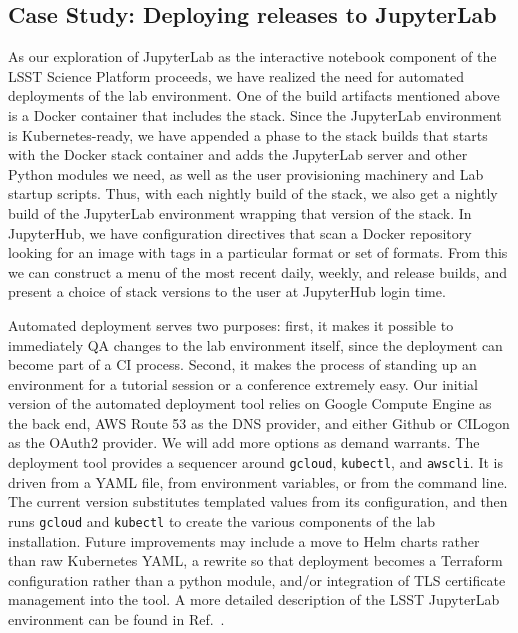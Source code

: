 \subsection{Case Study: Deploying releases to JupyterLab}
\label{sec:jupyterlab}

As our exploration of JupyterLab as the interactive notebook component
of the LSST Science Platform\cite{LSE-319} proceeds, we have realized the need for
automated deployments of the lab environment.
One of the build artifacts mentioned above is a Docker container that includes the stack.
Since the
JupyterLab environment is Kubernetes-ready, we have appended a phase to
the stack builds that starts with the Docker stack container and adds
the JupyterLab server and other Python modules we need, as well as the
user provisioning machinery and Lab startup scripts.  Thus, with each
nightly build of the stack, we also get a nightly build of the
JupyterLab environment wrapping that version of the stack.  In
JupyterHub, we have configuration directives that scan a Docker
repository looking for an image with tags in a particular format or set
of formats.  From this we can construct a menu of the most recent daily,
weekly, and release builds, and present a choice of stack versions to
the user at JupyterHub login time.

Automated deployment serves two
purposes: first, it makes it possible to immediately QA changes to the
lab environment itself, since the deployment can become part of a CI
process.  Second, it makes the process of standing up an environment for
a tutorial session or a conference extremely easy.  Our initial version
of the automated deployment tool relies on Google Compute Engine as the
back end, AWS Route 53 as the DNS provider, and either Github or CILogon
as the OAuth2 provider.  We will add more options as demand warrants.
The deployment tool provides a sequencer around \texttt{gcloud}, \texttt{kubectl}, and
\texttt{awscli}.  It is driven from a YAML file, from environment variables, or
from the command line.
The current version substitutes templated values from its configuration, and then runs \texttt{gcloud}
and \texttt{kubectl} to create the various components of the lab installation.
Future improvements may include a move to Helm charts rather than raw
Kubernetes YAML, a rewrite so that deployment becomes a Terraform
configuration rather than a python module, and/or integration of TLS
certificate management into the tool.
 A more detailed description of the LSST JupyterLab environment can be found in Ref.~.
